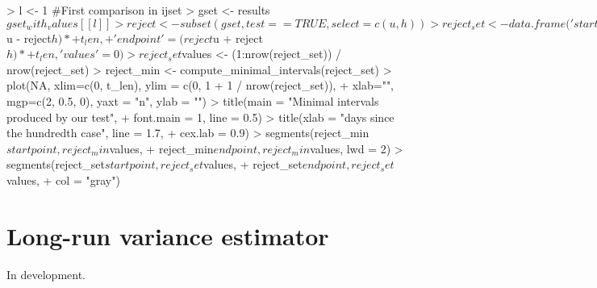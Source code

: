\documentclass[a4paper]{article}
\begin{document}
\begin{Schunk}
\begin{Sinput}
> l <- 1 #First comparison in ijset
> gset       <- results$gset_with_values[[l]]
> reject     <- subset(gset, test == TRUE, select = c(u, h))
> reject_set <- data.frame('startpoint' = (reject$u - reject$h) *
+                            t_len,
+                          'endpoint' = (reject$u + reject$h) *
+                            t_len, 'values' = 0)
> reject_set$values <- (1:nrow(reject_set)) / nrow(reject_set)
> reject_min        <- compute_minimal_intervals(reject_set)
> plot(NA, xlim=c(0, t_len),  ylim = c(0, 1 + 1 / nrow(reject_set)),
+      xlab="", mgp=c(2, 0.5, 0), yaxt = "n", ylab = "")
> title(main = "Minimal intervals produced by our test",
+       font.main = 1, line = 0.5)
> title(xlab = "days since the hundredth case", line = 1.7,
+       cex.lab = 0.9)
> segments(reject_min$startpoint, reject_min$values,
+          reject_min$endpoint, reject_min$values, lwd = 2)
> segments(reject_set$startpoint, reject_set$values,
+          reject_set$endpoint, reject_set$values,
+          col = "gray")
\end{Sinput}
\end{Schunk}



\section{Long-run variance estimator}\label{sec:lrv}

In development.
\end{document}
